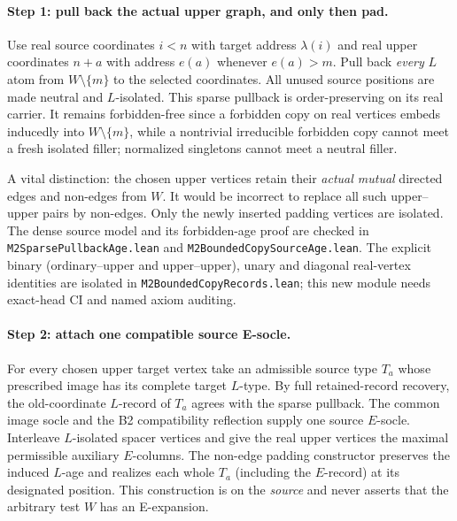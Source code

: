 \paragraph{Step 1: pull back the actual upper graph, and only then pad.}
Use real source coordinates $i<n$ with target address $\lambda(i)$
and real upper coordinates $n+a$ with address $e(a)$ whenever
$e(a)>m$. Pull back \emph{every} $L$ atom from
$W\setminus\{m\}$ to the selected coordinates. All unused source
positions are made neutral and $L$-isolated. This sparse pullback
is order-preserving on its real carrier. It remains
forbidden-free since a forbidden copy on real vertices embeds
inducedly into $W\setminus\{m\}$, while a nontrivial irreducible
forbidden copy cannot meet a fresh isolated filler; normalized
singletons cannot meet a neutral filler.

A vital distinction: the chosen upper vertices retain their
\emph{actual mutual} directed edges and non-edges from $W$.
It would be incorrect to replace all such upper--upper pairs by
non-edges. Only the newly inserted padding vertices are isolated.
The dense source model and its forbidden-age proof are checked
in \texttt{M2SparsePullbackAge.lean} and
\texttt{M2BoundedCopySourceAge.lean}. The explicit binary
(ordinary--upper and upper--upper), unary and diagonal real-vertex
identities are isolated in \texttt{M2BoundedCopyRecords.lean};
this new module needs exact-head CI and named axiom auditing.

\paragraph{Step 2: attach one compatible source E-socle.}
For every chosen upper target vertex take an admissible source
type $T_a$ whose prescribed image has its complete target $L$-type.
By full retained-record recovery, the old-coordinate $L$-record
of $T_a$ agrees with the sparse pullback. The common image socle
and the B2 compatibility reflection supply one source $E$-socle.
Interleave $L$-isolated spacer vertices and give the real upper
vertices the maximal permissible auxiliary $E$-columns. The
non-edge padding constructor preserves the induced $L$-age and
realizes each whole $T_a$ (including the $E$-record) at its
designated position. This construction is on the \emph{source}
and never asserts that the arbitrary test $W$ has an E-expansion.


